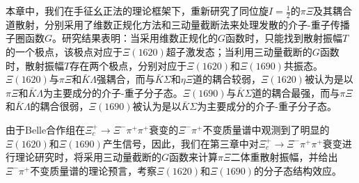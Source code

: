 本章中，我们在手征幺正法的理论框架下，重新研究了同位旋$I=\frac{1}{2}$的$\pi\Xi$及其耦合道散射，分别采用了维数正规化方法和三动量截断法来处理发散的介子-重子传播子圈函数$G$。研究结果表明：当采用维数正规化的$G$函数时，只能找到散射振幅$T$的一个极点，该极点对应于$\Xi(1620)$超子激发态；当利用三动量截断的$G$函数时，散射振幅$T$存在两个极点，分别对应于$\Xi(1620)$和$\Xi(1690)$共振态。$\Xi(1620)$与$\pi\Xi$和$\bar{K}\Lambda$强耦合，而与$\bar{K}\Sigma$和$\eta\Xi$道的耦合较弱，$\Xi(1620)$被认为是以$\pi\Xi$和$\bar{K}\Lambda$为主要成分的介子-重子分子态。$\Xi(1690)$与$\bar{K}\Sigma$道的耦合最强，而与$\pi\Xi$和$\bar{K}\Lambda$的耦合很弱，$\Xi(1690)$被认为是以$\bar{K}\Sigma$为主要成分的介子-重子分子态。\par
由于Belle合作组在$\Xi_{c}^{+}\to\Xi^{-}\pi^{+}\pi^{+}$衰变的$\Xi^{-}\pi^{+}$不变质量谱中观测到了明显的$\Xi(1620)$和$\Xi(1690)$产生信号，因此，我们在第三章中对$\Xi_{c}^{+}\to\Xi^{-}\pi^{+}\pi^{+}$衰变进行理论研究时，将采用三动量截断的$G$函数来计算$\pi\Xi$二体重散射振幅，并给出$\Xi^{-}\pi^{+}$不变质量谱的理论预言，考察$\Xi(1620)$和$\Xi(1690)$的分子态结构效应。
